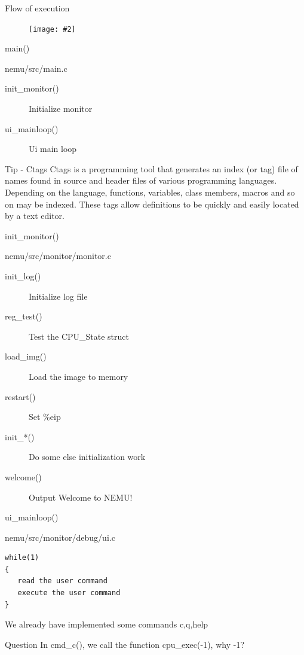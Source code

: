 \documentclass{beamer}
\newcommand{\fignocaption}[2]{
	\begin{figure}[htp]
		\centering
		\texttt{[image: \#2]}
	\end{figure}
}
\begin{document}
\begin{frame}{Flow of execution}
\fignocaption{scale=0.35}{mainc.png}
\end{frame}

\begin{frame}{main()}
	\begin{block}{nemu/src/main.c}
		\begin{description}
			\item[init\_monitor()] Initialize monitor
			\item[ui\_mainloop()] Ui main loop
		\end{description}
	\end{block}
	\begin{alertblock}{Tip - Ctags}
Ctags is a programming tool that generates an index (or tag) file of names found in source and header files of various programming languages. Depending on the language, functions, variables, class members, macros and so on may be indexed. These tags allow definitions to be quickly and easily located by a text editor.
	\end{alertblock}
\end{frame}

\begin{frame}{init\_monitor()}
	\begin{block}{nemu/src/monitor/monitor.c}
	\begin{description}
		\item [init\_log()]Initialize log file
		\item [reg\_test()]Test the CPU\_State struct
		\item [load\_img()]Load the image to memory
		\item [restart()]Set \%eip
		\item [init\_*()]Do some else  initialization work
		\item [welcome()]Output \alert{Welcome to NEMU!}
	\end{description}
\end{block}
\end{frame}


\begin{frame}[fragile]{ui\_mainloop()}
	\begin{block}{nemu/src/monitor/debug/ui.c}
\begin{verbatim}
while(1)
{
   read the user command
   execute the user command
}
\end{verbatim}
	\end{block}
\begin{block}{We already have implemented some commands}
	c,q,help
\end{block}

\begin{block}

\end{block}

\begin{exampleblock}{Question}
	In cmd\_c(), we call the function cpu\_exec(-1), why -1? 
\end{exampleblock}

\end{frame}
\end{document}
